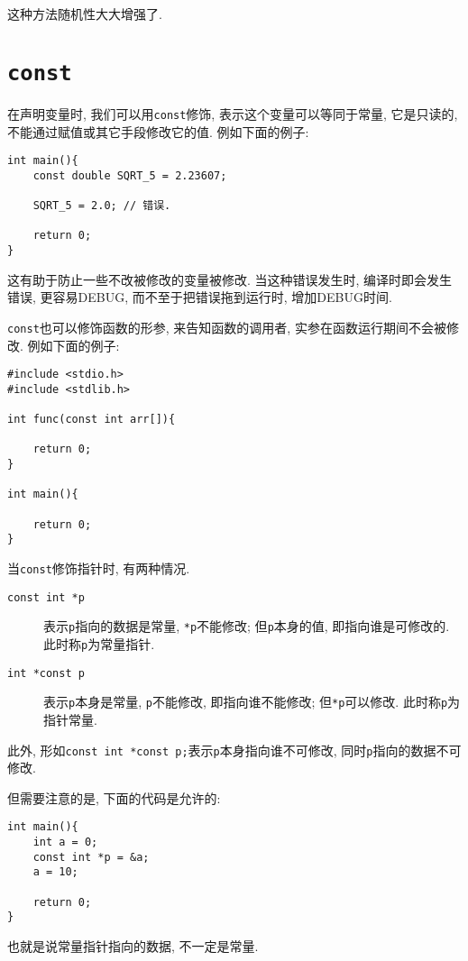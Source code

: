         这种方法随机性大大增强了.

    \section{\texttt{const}} 
        在声明变量时, 我们可以用\texttt{const}修饰, 表示这个变量可以等同于常量, 它是只读的, 不能通过赋值或其它手段修改它的值. 例如下面的例子:
\begin{lstlisting}
int main(){
    const double SQRT_5 = 2.23607;

    SQRT_5 = 2.0; // 错误.

    return 0;
}
\end{lstlisting}

        这有助于防止一些不改被修改的变量被修改. 当这种错误发生时, 编译时即会发生错误, 更容易DEBUG, 而不至于把错误拖到运行时, 增加DEBUG时间.

        \texttt{const}也可以修饰函数的形参, 来告知函数的调用者, 实参在函数运行期间不会被修改. 例如下面的例子:
\begin{lstlisting}
#include <stdio.h>
#include <stdlib.h>

int func(const int arr[]){

    return 0;
}

int main(){

    return 0;
}
\end{lstlisting}

        当\texttt{const}修饰指针时, 有两种情况.

        \begin{description}
            \item[\texttt{const int *p}] 表示\texttt{p}指向的数据是常量, \texttt{*p}不能修改; 但\texttt{p}本身的值, 即指向谁是可修改的. 此时称\texttt{p}为常量指针.
            \item[\texttt{int *const p}] 表示\texttt{p}本身是常量, \texttt{p}不能修改, 即指向谁不能修改; 但\texttt{*p}可以修改. 此时称\texttt{p}为指针常量.
        \end{description}

        此外, 形如\texttt{const int *const p;}表示\texttt{p}本身指向谁不可修改, 同时\texttt{p}指向的数据不可修改.

        但需要注意的是, 下面的代码是允许的:
\begin{lstlisting}
int main(){
    int a = 0;
    const int *p = &a;
    a = 10;

    return 0;
}
\end{lstlisting}

        也就是说常量指针指向的数据, 不一定是常量.